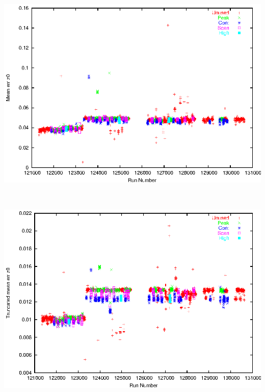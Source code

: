 \documentclass[12pt]{article}
\begin{document}
\mbox{ }

\vfill
\includegraphics[height=0.9\linewidth, angle=90]{meanerrz0.eps}

\vfill
\pagebreak

\mbox{ }

\vfill
\includegraphics[height=0.9\linewidth, angle=90]{meancuterrz0.eps}

\vfill
\pagebreak
\end{document}
